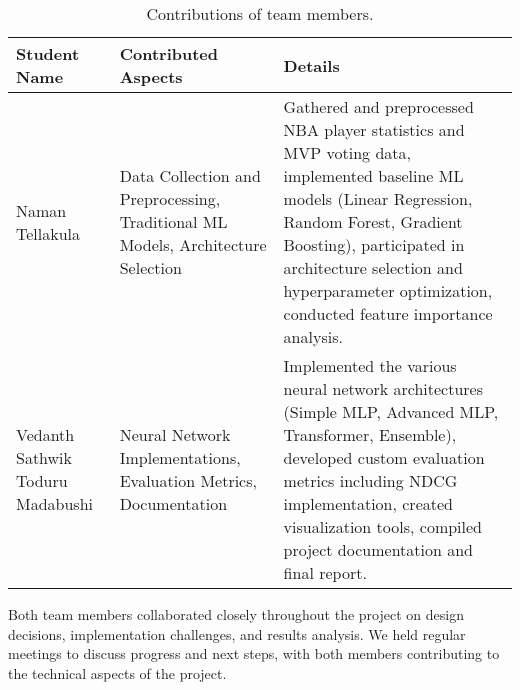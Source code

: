 \documentclass[10pt,twocolumn,letterpaper]{article}
\begin{document}
\begin{table*}[h!]
\begin{center}
\begin{tabular}{|p{3cm}|p{4.5cm}|p{4.5cm}|}
\hline
Student Name & Contributed Aspects & Details \\
\hline\hline
Naman Tellakula & Data Collection and Preprocessing, Traditional ML Models, Architecture Selection & Gathered and preprocessed NBA player statistics and MVP voting data, implemented baseline ML models (Linear Regression, Random Forest, Gradient Boosting), participated in architecture selection and hyperparameter optimization, conducted feature importance analysis. \\
\hline
Vedanth Sathwik Toduru Madabushi & Neural Network Implementations, Evaluation Metrics, Documentation & Implemented the various neural network architectures (Simple MLP, Advanced MLP, Transformer, Ensemble), developed custom evaluation metrics including NDCG implementation, created visualization tools, compiled project documentation and final report. \\
\hline
\end{tabular}
\end{center}
\caption{Contributions of team members.}
\label{tab:contributions}
\end{table*}

Both team members collaborated closely throughout the project on design decisions, implementation challenges, and results analysis. We held regular meetings to discuss progress and next steps, with both members contributing to the technical aspects of the project.
\end{document}
